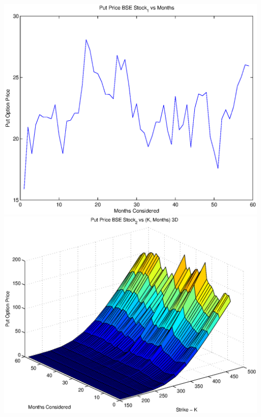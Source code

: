 \documentclass{article}
\begin{document}
\includegraphics[width=\textwidth]{Put_Price_BSE_Stock_1_vs_Months} \\

\includegraphics[width=\textwidth]{Put_Price_BSE_Stock_2_vs_(K,_Months)_3D} \\
\end{document}
